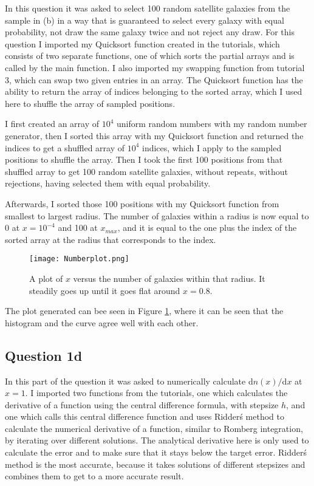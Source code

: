 In this question it was asked to select 100 random satellite galaxies from the sample in (b) in a way that is guaranteed to select every galaxy with equal probability, not draw the same galaxy twice and not reject any draw.
For this question I imported my Quicksort function created in the tutorials, which consists of two separate functions, one of which sorts the partial arrays and is called by the main function.
I also imported my swapping function from tutorial 3, which can swap two given entries in an array.
The Quicksort function has the ability to return the array of indices belonging to the sorted array, which I used here to shuffle the array of sampled positions.

I first created an array of $10^4$ uniform random numbers with my random number generator, then I sorted this array with my Quicksort function and returned the indices to get a shuffled array of $10^4$ indices, which I apply to the sampled positions to shuffle the array.
Then I took the first 100 positions from that shuffled array to get 100 random satellite galaxies, without repeats, without rejections, having selected them with equal probability.

Afterwards, I sorted those 100 positions with my Quicksort function from smallest to largest radius.
The number of galaxies within a radius is now equal to 0 at $x = 10^{-4}$ and 100 at $x_{max}$, and it is equal to the one plus the index of the sorted array at the radius that corresponds to the index.

\begin{figure}[ht!]
  \centering
  \texttt{[image: Numberplot.png]}
  \caption{A plot of $x$ versus the number of galaxies within that radius. It steadily goes up until it goes flat around $x = 0.8$.}
  \label{fig:Nr}
\end{figure}

The plot generated can bee seen in Figure \ref{fig:Nr}, where it can be seen that the histogram and the curve agree well with each other.


\subsection{Question 1d}

In this part of the question it was asked to numerically calculate d$n(x)/$d$x$ at $x = 1$.
I imported two functions from the tutorials, one which calculates the derivative of a function using the central difference formula, with stepsize $h$, and one which calls this central difference function and uses Ridder\'s method to calculate the numerical derivative of a function, similar to Romberg integration, by iterating over different solutions. 
The analytical derivative here is only used to calculate the error and to make sure that it stays below the target error.
Ridder\'s method is the most accurate, because it takes solutions of different stepsizes and combines them to get to a more accurate result.

